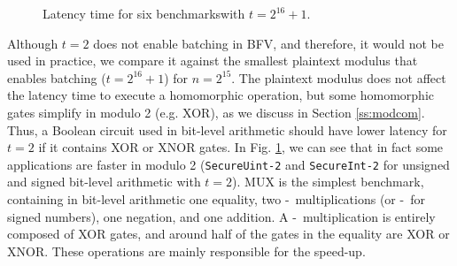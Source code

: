\begin{figure}[t]
	\centering
	\caption{Latency time for six benchmarkswith $t=2^{16}+1$. }
	\label{fig:benchmarks}
	\vspace{-0.4cm} 
\end{figure}

 Although $t=2$ does not enable batching in BFV, and therefore, it would not be used in practice, we compare it against the smallest plaintext modulus that enables batching ($t=2^{16}+1$) for $n=2^{15}$. The plaintext modulus does not affect the latency time to execute a homomorphic operation, but some homomorphic gates simplify in modulo 2 (e.g. XOR), as we discuss in Section \ref{ss:modcom}. Thus, a Boolean circuit used in bit-level arithmetic should have lower latency for $t=2$ if it contains XOR or XNOR gates. In Fig. \ref{fig:benchmarks}, we can see that in fact some applications are faster in modulo 2 (\texttt{SecureUint-2} and \texttt{SecureInt-2} for unsigned and signed bit-level arithmetic with $t=2$). MUX is the simplest benchmark, containing in bit-level arithmetic one equality, two \secbool-\secuint\ multiplications (or \secbool-\secint\ for signed numbers), one negation, and one addition. A \secbool-\secuint\ multiplication is entirely composed of XOR gates, and around half of the gates in the equality are XOR or XNOR. These operations are mainly responsible for the speed-up. 

